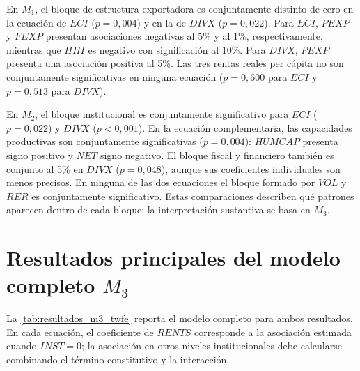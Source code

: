 \documentclass[../../TFM.tex]{subfiles}
\begin{document}
En $M_1$, el bloque de estructura exportadora es conjuntamente distinto de
cero en la ecuación de $ECI$ ($p=0,004$) y en la de $DIVX$ ($p=0,022$). Para
$ECI$, $PEXP$ y $FEXP$ presentan asociaciones negativas al 5\% y al 1\%,
respectivamente, mientras que $HHI$ es negativo con significación al 10\%. Para
$DIVX$, $PEXP$ presenta una asociación positiva al 5\%. Las tres rentas reales
per cápita no son conjuntamente significativas en ninguna ecuación
($p=0,600$ para $ECI$ y $p=0,513$ para $DIVX$).

En $M_2$, el bloque institucional es conjuntamente significativo para $ECI$
($p=0,022$) y $DIVX$ ($p<0,001$). En la ecuación complementaria, las capacidades
productivas son conjuntamente significativas ($p=0,004$): $HUMCAP$ presenta
signo positivo y $NET$ signo negativo. El bloque fiscal y financiero también
es conjunto al 5\% en $DIVX$ ($p=0,048$), aunque sus coeficientes individuales
son menos precisos. En ninguna de las dos ecuaciones el bloque formado por
$VOL$ y $RER$ es conjuntamente significativo. Estas comparaciones describen
qué patrones aparecen dentro de cada bloque; la interpretación sustantiva se
basa en $M_3$.


\section{Resultados principales del modelo completo $M_3$}
\label{sec:resultados-m3}

La \autoref{tab:resultados_m3_twfe} reporta el modelo completo para ambos
resultados. En cada ecuación, el coeficiente de $RENTS$ corresponde a la
asociación estimada cuando $INST=0$; la asociación en otros niveles
institucionales debe calcularse combinando el término constitutivo y la
interacción.
\end{document}
